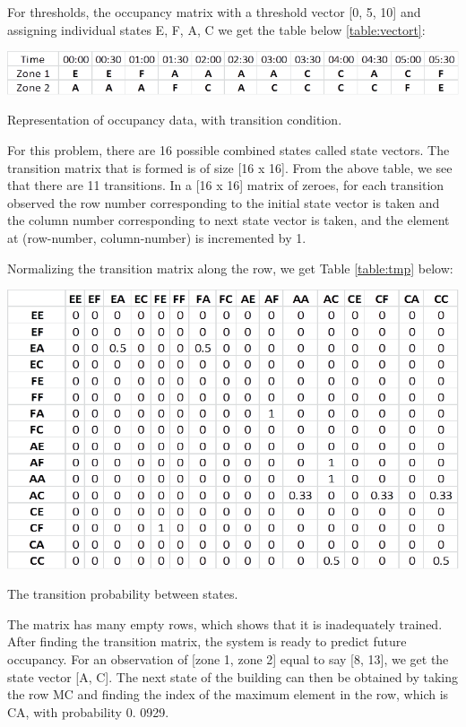 For thresholds, the occupancy matrix with a threshold vector [0, 5, 10] and assigning individual states {E, F, A, C} we get the table below \ref{table:vectort}:
\begin{table}[!ht]
  \centering
  \includegraphics[width=0.9\columnwidth]{./images/t2.png}
  \caption{Representation of occupancy data, with transition condition.}\label{table:vectort}
\end{table}

For this problem, there are 16 possible combined states called state vectors.  The transition matrix that is formed is of size [16 x 16].  From the above table, we see that there are 11 transitions.  In a [16 x 16] matrix of zeroes,  for each transition observed the row number corresponding to the initial state vector is taken and the column number corresponding to next state vector is taken,  and the element at (row-number,  column-number) is incremented by 1.

Normalizing the transition matrix along the row, we get Table \ref{table:tmp} below:
\begin{table}[!ht]
  \centering
    \includegraphics[width=0.9\columnwidth]{./images/t4.png}
  \caption{The transition probability between states.}\label{table:tmp}
\end{table}

The matrix has many empty rows, which shows that it is inadequately trained. After finding the transition matrix, the system is ready to predict future occupancy.  For an observation of [zone 1, zone 2] equal to say [8, 13], we get the state vector [A, C].  The next state of the building can then be obtained by taking the row MC and finding the index of the maximum element in the row, which is CA, with probability 0. 0929.




